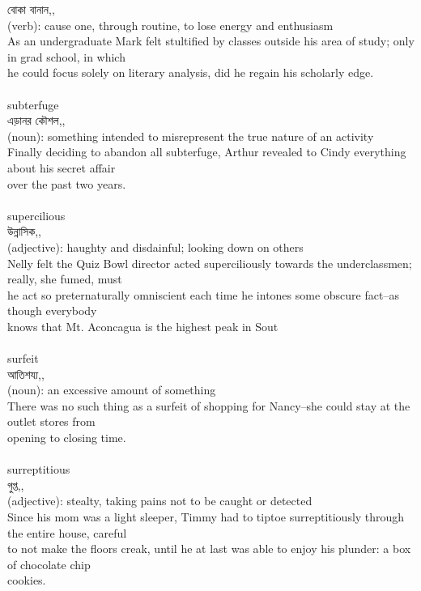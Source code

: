 \documentclass{article}
\begin{document}
{{বোকা বানান,,}\\
{(verb): cause one, through routine, to lose energy and enthusiasm\\As an undergraduate Mark felt stultified by classes outside his area of study; only in grad school, in which\\he could focus solely on literary analysis, did he regain his scholarly edge.\\}\\
{subterfuge}\\
{এড়ানর কৌশল,,}\\
{(noun): something intended to misrepresent the true nature of an activity\\Finally deciding to abandon all subterfuge, Arthur revealed to Cindy everything about his secret affair\\over the past two years.\\}\\
{supercilious}\\
{উন্নাসিক,,}\\
{(adjective): haughty and disdainful; looking down on others\\Nelly felt the Quiz Bowl director acted superciliously towards the underclassmen; really, she fumed, must\\he act so preternaturally omniscient each time he intones some obscure fact--as though everybody\\knows that Mt. Aconcagua is the highest peak in Sout\\}\\
{surfeit}\\
{আতিশয্য,,}\\
{(noun): an excessive amount of something\\There was no such thing as a surfeit of shopping for Nancy--she could stay at the outlet stores from\\opening to closing time.\\}\\
{surreptitious}\\
{গুপ্ত,,}\\
{(adjective): stealty, taking pains not to be caught or detected\\Since his mom was a light sleeper, Timmy had to tiptoe surreptitiously through the entire house, careful\\to not make the floors creak, until he at last was able to enjoy his plunder: a box of chocolate chip\\cookies.\\}\\
}
\end{document}
